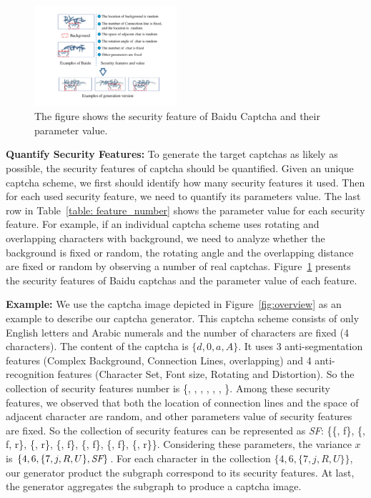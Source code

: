 \begin{figure}
  \centering
  \includegraphics[width=0.47\textwidth]{fig/captcha_analysis/captcha_analysis.pdf}
  \caption{The figure shows the security feature of Baidu Captcha and their parameter value.}
  \label{fig: captcha_analysis}
\end{figure}

\noindent \textbf{Quantify Security Features:} To generate the target captchas as likely as possible, the security features of captcha should be quantified. Given an unique captcha scheme, we first should identify how many security features it used. Then for each used security feature, we need to quantify its parameters value. The last row in Table~\ref{table: feature_number} shows the parameter value for each security feature. For example, if an individual captcha scheme uses rotating and overlapping characters with background, we need to analyze whether the background is fixed or random, the rotating angle and the overlapping distance are fixed or random by observing a number of real captchas. Figure~\ref{fig: captcha_analysis} presents the security features of Baidu captchas and the parameter value of each feature.

\noindent \textbf{Example:} We use the captcha image depicted in Figure~\ref{fig:overview} as an example to describe our captcha generator. This captcha scheme consists of only English letters and Arabic numerals and the number of characters are fixed (4 characters). The content of the captcha is $\{d, 0, a, A\}$.
It uses 3 anti-segmentation features (Complex Background, Connection Lines, overlapping) and 4 anti-recognition features (Character Set, Font size, Rotating and Distortion). So the collection of security features number is \{, , , , , , \}.
Among these security features, we observed that both the location of connection lines and the space of adjacent character are random, and other parameters value of security features are fixed. So the collection of security features can be represented as \emph{SF}: \{\{, f\}, \{, f, r\}, \{, r\}, \{, f\}, \{, f\}, \{, f\}, \{, r\}\}.
Considering these parameters, the variance $x$ is $\{4, 6, \{7, j, R, U\}, \emph{SF}\}$.
For each character in the collection $\{4, 6, \{7, j, R, U\}\}$, our generator product the subgraph correspond to its security features. At last, the generator aggregates the subgraph to produce a captcha image.

